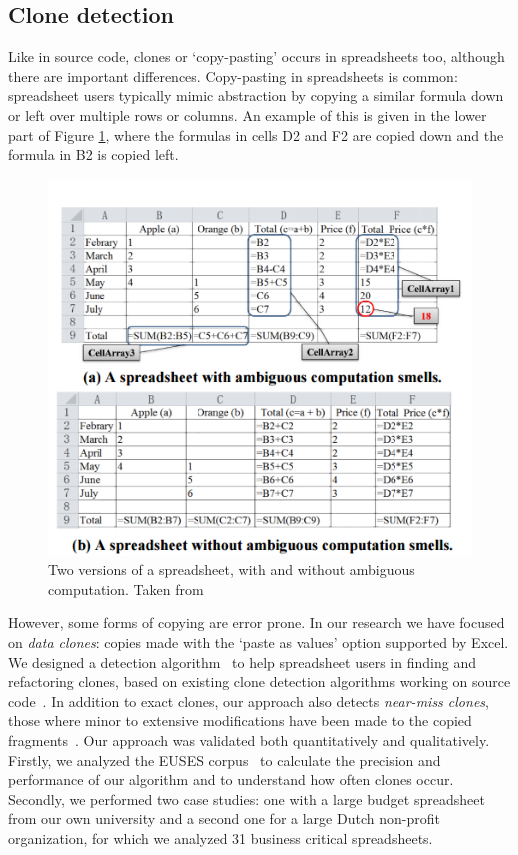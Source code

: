 \documentclass[conference]{IEEEtran}
\begin{document}
\subsection{Clone detection}
Like in source code, clones or `copy-pasting' occurs in spreadsheets too, although there are important differences. 
Copy-pasting in spreadsheets is common: spreadsheet users typically mimic abstraction by copying a similar formula down or left over multiple rows or columns. An example of this is given in the lower part of Figure \ref{fig:ambig}, where the formulas in cells D2 and F2 are copied down and the formula in B2 is copied left.

\begin{figure}
  \begin{center}
  \includegraphics[width=\columnwidth]{fig/ambig.png}
  \caption{Two versions of a spreadsheet, with and without ambiguous computation. Taken from \cite{dou_is_2014}}
  \label{fig:ambig}
  \end{center}
\end{figure} 

However, some forms of copying are error prone. In our research we have focused on \emph{data clones}: copies made with the `paste as values' option supported by Excel.  We designed a detection algorithm~\cite{hermans_data_2013} to help spreadsheet users in finding and refactoring clones, based on existing clone detection algorithms working on source code~\cite{DBLP:conf/cascon/Johnson93}. In addition to exact clones, our approach also detects \emph{near-miss clones}, those where minor to extensive modifications have been made to the copied fragments~\cite{DBLP:conf/icsm/Roy09}. Our approach was  validated both quantitatively and qualitatively. Firstly, we analyzed the EUSES corpus~\cite{fisher_euses_2005} to calculate the precision and performance of our algorithm and to understand how often clones occur. Secondly, we performed two case studies: one with a large budget spreadsheet from our own university and a second one for a large Dutch non-profit organization, for which we analyzed 31 business critical spreadsheets.
\end{document}
